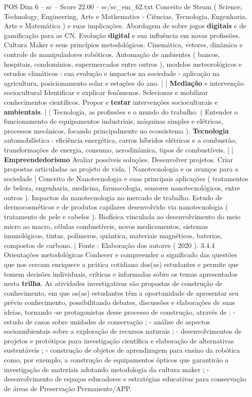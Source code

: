 \begin{textsample}{POS Dim 6 – sc – Score 22.00 – sc/sc\_em\_62.txt}
Conceito de Steam ( Science, Technology, Engineering, Arts e Mathematics - Ciências, Tecnologia, Engenharia, Arte e Matemática ) e suas implicações.
Abordagem de sobre jogos \textbf{digitais} e de gamificação para as CN.
Evolução \textbf{digital} e sua influência em novas profissões.
Cultura Maker e seus princípios metodológicos.
Cinemática, vetores, dinâmica e controle de manipuladores robóticos.
Automação de ambientes ( bancos, hospitais, condomínios, supermercados entre outros ), modelos meteorológicos e estudos climáticos : sua evolução e impactos na sociedade - aplicação na agricultura, posicionamento solar e estações do ano. | | \textbf{Mediação} e intervenção sociocultural Identificar e explicar fenômenos.
Selecionar e mobilizar conhecimentos científicos.
Propor e \textbf{testar} intervenções socioculturais e \textbf{ambientais}. | | Tecnologia, as profissões e o mundo do trabalho. ( Entender o funcionamento de equipamentos industriais, máquinas simples e elétricas, processos mecânicos, focando principalmente no ecossistema ). \textbf{Tecnologia} automobilística : eficiência energética, carros híbridos elétricos e a combustão, transformações de energia, consumo, aerodinâmica, tipos de combustíveis. | | \textbf{Empreendedorismo} Avaliar possíveis soluções.
Desenvolver projetos.
Criar propostas articuladas ao projeto de vida. | Nanotecnologia e os avanços para a sociedade | Conceito de Nanotecnologia e suas principais aplicações ( tratamentos de beleza, engenharia, medicina, farmacologia, sensores nanotecnológicos, entre outros ).
Impactos da nanotecnologia no mercado de trabalho.
Estudo de dermocosméticos e de produtos capilares desenvolvido via nanotecnologia ( tratamento de pele e cabelos ).
Biofísica vinculada ao desenvolvimento do meio micro ao macro, células combustíveis, novos medicamentos, sistemas imunológicos, tintas, polímeros, quântica, materiais magnéticos, baterias, compostos de carbono. | Fonte : Elaboração dos autores ( 2020 ). 3.4.4 Orientações metodológicas Conhecer e compreender o significado das questões que nos cercam enriquece a prática cotidiana dos(as) estudantes e permite que tomem decisões individuais, críticas e informadas sobre os temas apresentados nesta \textbf{trilha}.
As atividades investigativas são propostas de construção de conhecimento, em que os(as) estudantes têm a oportunidade de apresentar seu prévio conhecimento, possibilitando debates, discussões e elaborações de suas ideias, tornando -se protagonistas desse processo de construção, através de : - estudo de casos sobre unidades de conservação ; - análise de aspectos socioambientais sobre a exploração de recursos naturais ; - desenvolvimentos de projetos e protótipos para investigação científica e elaboração de alternativas sustentáveis ; - construção de objetos de aprendizagem para ensino da robótica como, por exemplo, a construção de equipamentos ópticos que garantirão a investigação de materiais adotando metodologia da cultura maker ; - desenvolvimento de espaços educadores e estratégias educativas para conservação de áreas de Preservação Permanente/APP.

\end{textsample}
